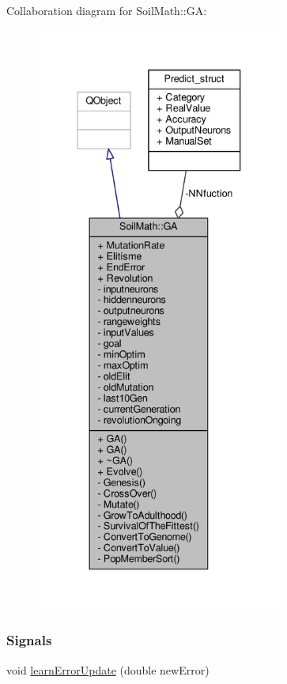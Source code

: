 Collaboration diagram for Soil\+Math\+:\+:G\+A\+:
\nopagebreak
\begin{figure}[H]
\begin{center}
\leavevmode
\includegraphics[height=550pt]{class_soil_math_1_1_g_a__coll__graph}
\end{center}
\end{figure}
\subsubsection*{Signals}
\begin{DoxyCompactItemize}
\item 
void \hyperlink{class_soil_math_1_1_g_a_a3b7d8649411ccebc8cb6f44ed1ba2365}{learn\+Error\+Update} (double new\+Error)
\end{DoxyCompactItemize}
